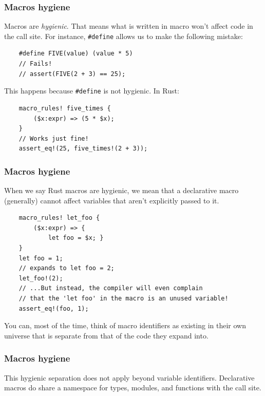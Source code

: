 \documentclass[aspectratio=1610,t]{beamer}
\begin{document}
\begin{frame}[fragile]
\frametitle{Macros hygiene}
Macros are \textit{hygienic}. That means what is written in macro won't affect code in the call site. For instance, \texttt{\#define} allows us to make the following mistake:

\begin{verbatim}
    #define FIVE(value) (value * 5)
    // Fails!
    // assert(FIVE(2 + 3) == 25);
\end{verbatim}

This happens because \texttt{\#define} is not hygienic. In Rust:

\begin{verbatim}
    macro_rules! five_times {
        ($x:expr) => (5 * $x);
    }
    // Works just fine!
    assert_eq!(25, five_times!(2 + 3));
\end{verbatim}
\end{frame}


\begin{frame}[fragile]
\frametitle{Macros hygiene}
When we say Rust macros are hygienic, we mean that a declarative macro (generally) cannot affect variables that aren’t explicitly passed to it.

\begin{verbatim}
    macro_rules! let_foo {
        ($x:expr) => {
            let foo = $x; }
    }
    let foo = 1;
    // expands to let foo = 2;
    let_foo!(2);
    // ...But instead, the compiler will even complain
    // that the 'let foo' in the macro is an unused variable!
    assert_eq!(foo, 1);
\end{verbatim}

You can, most of the time, think of macro identifiers as existing in their own universe that is separate from that of the code they expand into.
\end{frame}


\begin{frame}[fragile]
\frametitle{Macros hygiene}
This hygienic separation does not apply beyond variable identifiers. Declarative macros do share a namespace for types, modules, and functions with the call site.

\end{frame}
\end{document}
